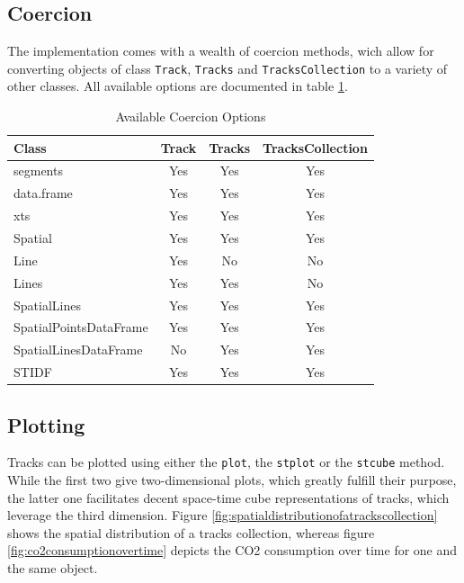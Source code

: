 \documentclass{article}
\newcommand{\code}[1]{{\tt #1}}
\begin{document}
\subsection{Coercion}

The implementation comes with a wealth of coercion methods, wich allow for converting objects of class \code{Track}, \code{Tracks} and \code{TracksCollection} to a variety of other classes. All available options are documented in table \ref{tab:availablecoercionoptions}.

\begin{table}[h]
\centering
\begin{tabular}{lccc}
\hline\hline
Class & Track & Tracks & TracksCollection\\
\hline
segments & Yes & Yes & Yes\\
data.frame & Yes & Yes & Yes\\
xts & Yes & Yes & Yes\\
Spatial & Yes & Yes & Yes\\
Line & Yes & No & No\\
Lines & Yes & Yes & No\\
SpatialLines & Yes & Yes & Yes\\
SpatialPointsDataFrame & Yes & Yes & Yes\\
SpatialLinesDataFrame & No & Yes & Yes\\
STIDF & Yes & Yes & Yes\\
\hline
\end{tabular}
\caption{Available Coercion Options}
\label{tab:availablecoercionoptions}
\end{table}

\subsection{Plotting}

Tracks can be plotted using either the \code{plot}, the \code{stplot} or the \code{stcube} method. While the first two give two-dimensional plots, which greatly fulfill their purpose, the latter one facilitates decent space-time cube representations of tracks, which leverage the third dimension. Figure \ref{fig:spatialdistributionofatrackscollection} shows the spatial distribution of a tracks collection, whereas figure \ref{fig:co2consumptionovertime} depicts the CO2 consumption over time for one and the same object.
\end{document}
